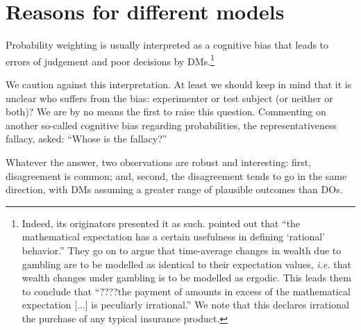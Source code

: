 \documentclass[a4paper, 12pt]{article}
\newcommand{\seclabel}[1]{\label{sec:#1}}
\newcommand{\ie}{\textit{i.e.}\xspace}
\begin{document}
\section{Reasons for different models\seclabel{Reasons_for}}
Probability weighting is usually interpreted as a cognitive bias that leads to errors of judgement and poor decisions by DMs.\footnote{Indeed, its originators presented it as such. \textcite{PrestonBaratta1948} pointed out that ``the mathematical expectation has a certain usefulness in defining `rational' behavior.'' They go on to argue that time-average changes in wealth due to gambling are to be modelled as identical to their expectation values, \ie that wealth changes under gambling is to be modelled as ergodic. This leads them to conclude that ``????the payment of amounts in excess of the mathematical expectation [...] is peculiarly irrational.'' We note that this declares irrational the purchase of any typical insurance product.}

We caution against this interpretation.
At least we should keep in mind that it is unclear who suffers from the bias: experimenter or test subject (or neither or both)?
We are by no means the first to raise this question.
Commenting on another so-called cognitive bias regarding probabilities, the representativeness fallacy, \textcite{Cohen1979a} asked: ``Whose is the fallacy?''

Whatever the answer, two observations are robust and interesting: first, disagreement is common; and, second, the disagreement tends to go in the same direction, with DMs assuming a greater range of plausible outcomes than DOs.
\end{document}
